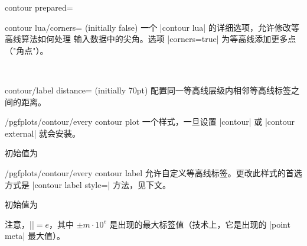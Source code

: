 {{\begin{plottype}[/pgfplots]{contour prepared=\textcolor{black}{}}
    \begin{pgfplotskey}{contour lua/corners= (initially false)}
        一个 |contour lua| 的详细选项，允许修改等高线算法如何处理
        输入数据中的尖角。选项 |corners=true| 为等高线添加更多点
        （"角点"）。
\begin{codeexample}[]
~
\end{codeexample}
    \end{pgfplotskey}

    \begin{pgfplotskey}{contour/label distance= (initially 70pt)}
        配置同一等高线层级内相邻等高线标签之间的距离。
    \end{pgfplotskey}

    \begin{stylekey}{/pgfplots/contour/every contour plot}
        一个样式，一旦设置 |contour| 或 |contour external| 就会安装。

        初始值为
\begin{codeexample}
\end{codeexample}
    \end{stylekey}

    \begin{stylekey}{/pgfplots/contour/every contour label}
        允许自定义等高线标签。更改此样式的首选方式是
        |contour label style=| 方法，见下文。

        初始值为
\begin{codeexample}
\end{codeexample}
    \noindent 注意，|\pgfplotspointmetarangeexponent|$=e$，其中
    $\pm m \cdot 10^e$ 是出现的最大标签值（技术上，它是出现的
    |point meta| 最大值）。


\end{stylekey}
\end{plottype}}}
